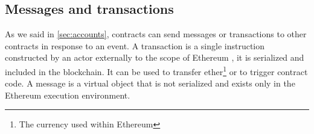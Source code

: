 \subsection{Messages and transactions}

As we said in \autoref{sec:accounts}, contracts can send messages or
transactions to other contracts in response to an event. A transaction is a
single instruction constructed by an actor externally to the scope of Ethereum
\cite{wood2018ethereum}, it is serialized and included in the blockchain. It can
be used to transfer ether\footnote{The currency used within Ethereum} or to
trigger contract code. A message is a virtual object that is not serialized and
exists only in the Ethereum execution environment.
